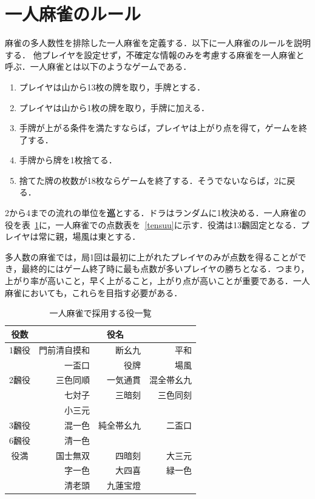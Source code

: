 \section{一人麻雀のルール}
 麻雀の多人数性を排除した一人麻雀を定義する．以下に一人麻雀のルールを説明する．\fi
他プレイヤを設定せず，不確定な情報のみを考慮する麻雀を一人麻雀と呼ぶ．一人麻雀とは以下のようなゲームである．
\begin{enumerate}
\item プレイヤは山から13枚の牌を取り，手牌とする．
\item プレイヤは山から1枚の牌を取り，手牌に加える．
\item 手牌が上がる条件を満たすならば，プレイヤは上がり点を得て，ゲームを終了する．
\item 手牌から牌を1枚捨てる．
\item 捨てた牌の枚数が18枚ならゲームを終了する．そうでないならば，2に戻る．
\end{enumerate}
2から4までの流れの単位を\textbf{巡}とする．ドラはランダムに1枚決める．一人麻雀の役を表~\ref{yaku}に，一人麻雀での点数表を~\ref{tensuu}に示す．役満は13飜固定となる．プレイヤは常に親，場風は東とする．

多人数の麻雀では，局1回は最初に上がれたプレイヤのみが点数を得ることができ，最終的にはゲーム終了時に最も点数が多いプレイヤの勝ちとなる．つまり，上がり率が高いこと，早く上がること，上がり点が高いことが重要である．一人麻雀においても，これらを目指す必要がある．

\begin{table}[p]
	\caption{一人麻雀で採用する役一覧}
	\label{yaku}
	\begin{center}
	 \begin{tabular}{|c|r|r|r|}
	 	\hline
	 	\textbf{役数} & \multicolumn{3}{|c|}{\textbf{役名}} \\ \hline
	 	1飜役 & 門前清自摸和 & 断幺九 & 平和 \\ \cline{2-4}
			  & 一盃口 & 役牌 & 場風 \\ \hline
	 	2飜役 & 三色同順 & 一気通貫 & 混全帯幺九 \\ \cline{2-4}
	 	      & 七対子 & 三暗刻 & 三色同刻 \\ \cline{2-4}
	 	      & 小三元 & & \\ \hline
	 	3飜役 & 混一色 & 純全帯幺九 & 二盃口 \\ \hline
	 	6飜役 & 清一色 & & \\ \hline
	 	役満   & 国士無双 & 四暗刻 & 大三元 \\ \cline{2-4}
	 	      & 字一色 & 大四喜 & 緑一色 \\ \cline{2-4}
	 	      & 清老頭 & 九蓮宝燈 & \\ \hline
		\end{tabular}
	\end{center}
\end{table}

